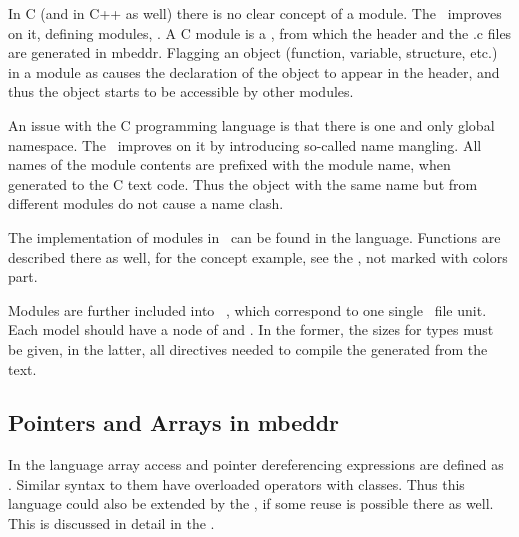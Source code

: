 In C (and in C++ as well) there is no clear concept of a module. The \mbp\ improves on it, defining 
modules, \cite{Voelter:MoDELS:2010}. A C module is a , from which the header and the .c files are generated in mbeddr.
Flagging an object (function, variable, structure, etc.) in a module as  causes the declaration of the object to appear
in the header, and thus the object starts to be accessible by other modules.

An issue with the C programming language is that there is one and only global namespace. The \mbp\ improves on it 
by introducing so-called name mangling. All names of the module contents are prefixed with the module name,
when generated to the C text code. Thus the object with the same name but from different modules do
not cause a name clash.

The implementation of modules in \mbdr\ can be found in the  language. Functions are described there as well,
for the  concept example, see the , not marked with colors part.

Modules are further included into \jbmps\ , which correspond to one single \jbmps\ file unit.
Each model should have a node of  and  .
In the former, the sizes for types must be given, in the latter, all directives needed to compile the 
generated from the  text.

\subsection{Pointers and Arrays in mbeddr}

In the  language array access and pointer dereferencing expressions are defined as .
Similar syntax to them have overloaded operators with classes. Thus this language could also be extended by the \pcpp,
if some reuse is possible there as well. This is discussed in detail in the .







